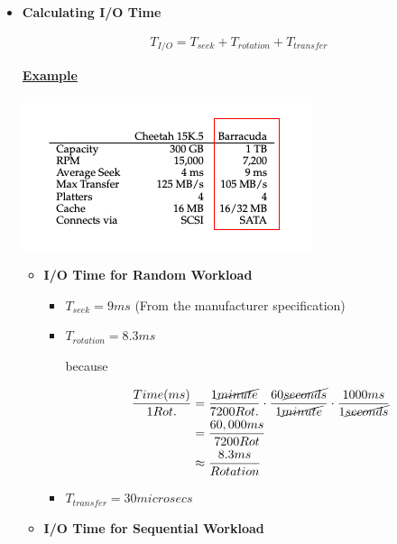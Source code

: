 \documentclass[12pt]{article}
\begin{document}
\begin{itemize}
    \item \textbf{Calculating I/O Time}

    \begin{align}
        T_{I/O} = T_{seek} + T_{rotation} + T_{transfer}
    \end{align}

    \bigskip

    \underline{\textbf{Example}}

    \begin{center}
        \includegraphics[width=0.6\linewidth]{../images/midterm_4_solution_58.png}
    \end{center}

    \begin{itemize}
        \item \textbf{I/O Time for Random Workload}

        \begin{itemize}
            \item $T_{seek} = 9ms$ (From the manufacturer specification)
            \item $T_{rotation} = 8.3ms$

            \bigskip

            because

            \begin{align}
                \frac{Time (ms)}{1 Rot.} &= \frac{1 \cancel{minute}}{7200 Rot.} \cdot \frac{60 \cancel{seconds}}{1 \cancel{minute}} \cdot \frac{1000 ms}{1 \cancel{seconds}}\\
                &= \frac{60,000 ms}{7200 Rot}\\
                &\approx \frac{8.3 ms}{Rotation}
            \end{align}

            \item $T_{transfer} = 30 microsecs$
        \end{itemize}

        \item \textbf{I/O Time for Sequential Workload}
    \end{itemize}



\end{itemize}
\end{document}
